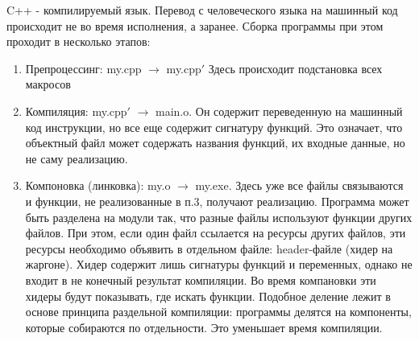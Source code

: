 \renewcommand{\mainFolder}{/home/aleksei/github_projects/latex_works/informatics}
\renewcommand{\myFolder}{\mainFolder/lecture_\arabic{lectureNo}/}

\renewcommand{\lectureSubject}{Введение в C++}
%


\begin{lecture}[\lectureSubject]
	\begin{lecSection}
		C++ - компилируемый язык. Перевод с человеческого языка на машинный код происходит не во время исполнения, а заранее. Сборка программы при этом проходит в несколько этапов:
		\begin{enumerate}
			\item Препроцессинг: my.cpp $\rightarrow$ my.cpp$'$
			Здесь происходит подстановка всех макросов
			\item Компиляция: my.cpp$'$ $\rightarrow$ main.o. Он содержит переведенную на машинный код инструкции, но все еще содержит сигнатуру функций. Это означает, что объектный файл может содержать названия функций, их входные данные, но не саму реализацию.
			\item Компоновка (линковка): my.o $\rightarrow$ my.exe. Здесь уже все файлы связываются и функции, не реализованные в п.3, получают реализацию. Программа может быть разделена на модули так, что разные файлы используют функции других файлов. При этом, если один файл ссылается на ресурсы других файлов, эти ресурсы необходимо объявить в отдельном файле: header-файле (хидер на жаргоне). Хидер содержит лишь сигнатуры функций и переменных, однако не входит в не конечный результат компиляции. Во время компановки эти хидеры будут показывать, где искать функции.
			Подобное деление лежит в основе принципа раздельной компиляции: программы делятся на компоненты, которые собираются по отдельности. Это уменьшает время компиляции.
		\end{enumerate}
	\end{lecSection}
	\begin{lecSection}[Синтаксис]

\end{lecSection}
\end{lecture}
